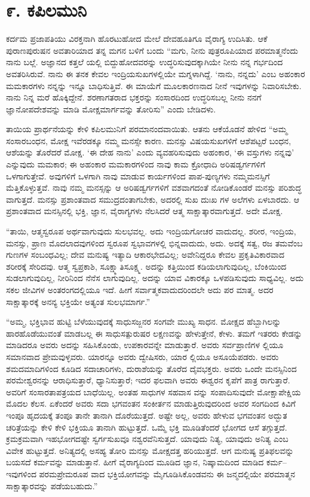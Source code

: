
\chapter{೯. ಕಪಿಲಮುನಿ}

ಕರ್ದಮ ಪ್ರಜಾಪತಿಯು ವಿರಕ್ತನಾಗಿ ಹೊರಟುಹೋದ ಮೇಲೆ ದೇವಹೂತಿಗೂ ವೈರಾಗ್ಯ ಉದಿಸಿತು. ಆಕೆ ಪುರಾಣಪುರುಷನ ಅವತಾರಿಯಾದ ತನ್ನ ಮಗನ ಬಳಿಗೆ ಬಂದು “ಮಗು, ನೀನು ಪುತ್ರರೂಪಿಯಾದ ಪರಮಾತ್ಮನೆಂದು ನಾನು ಬಲ್ಲೆ. ಅಜ್ಞಾನದ ಕತ್ತಲೆ ಯಲ್ಲಿ ಬಿದ್ದುಹೋದವರನ್ನು ಉದ್ಧರಿಸುವುದಕ್ಕಾಗಿಯೇ ನೀನು ನನ್ನ ಗರ್ಭದಿಂದ ಅವತರಿಸಿರುವೆ. ನಾನು ಈ ತನಕ ಕೇವಲ ಇಂದ್ರಿಯಸುಖಗಳಲ್ಲಿಯೇ ಮಗ್ನಳಾಗಿದ್ದೆ. ‘ನಾನು, ನನ್ನದು’ ಎಂಬ ಅಹಂಕಾರ ಮಮಕಾರಗಳು ನನ್ನನ್ನು ಇನ್ನೂ ಬಾಧಿಸುತ್ತಿವೆ. ಈ ಮಾಯೆಗೆ ಮೂಲಕಾರಣನಾದ ನೀನೆ ಇವುಗಳನ್ನು ನಿವಾರಿಸಬೇಕು. ನಾನು ನಿನ್ನ ಮರೆ ಹೊಕ್ಕಿದ್ದೇನೆ. ಶರಣಾಗತರಾದ ಭಕ್ತರನ್ನು ಸಂಸಾರದಿಂದ ಉದ್ಧರಿಸಬಲ್ಲ ನೀನು ನನಗೆ ಜ್ಞಾನೋಪದೇಶವನ್ನು ಮಾಡಿ ಮೋಕ್ಷಮಾರ್ಗವನ್ನು ತೋರಿಸು” ಎಂದು ಬೇಡಿದಳು.

ತಾಯಿಯ ಪ್ರಾರ್ಥನೆಯನ್ನು ಕೇಳಿ ಕಪಿಲಮುನಿಗೆ ಪರಮಾನಂದವಾಯಿತು. ಆತನು ಆಕೆಯೊಡನೆ ಹೇಳಿದ “ಅಮ್ಮ ಸಂಸಾರಬಂಧನ, ಮೋಕ್ಷ ಇವೆರಡಕ್ಕೂ ನಮ್ಮ ಮನಸ್ಸೇ ಕಾರಣ. ಮನಸ್ಸು ವಿಷಯಸುಖಗಳಿಗೆ ಆಶೆಪಟ್ಟರೆ ಬಂಧನ, ಆಶೆಯನ್ನು ತೊರೆದರೆ ಮೋಕ್ಷ. ‘ಈ ದೇಹ ನಾನು’ ಎಂದು ವ್ಯವಹರಿಸುವುದು ಅಹಂಕಾರ, ‘ಈ ವಸ್ತುಗಳು ನನ್ನವು’ ಎನ್ನುವುದು ಮಮಕಾರ; ಈ ಅಹಂಕಾರ ಮಮಕಾರಗಳಿಂದ ನಾವು ಕಾಮ ಕ್ರೋಧಾದಿ ಅರಿಷಡ್ವರ್ಗಗಳಿಗೆ ಒಳಗಾಗುತ್ತೇವೆ. ಅವುಗಳಿಗೆ ಒಳಗಾಗಿ ನಾವು ಮಾಡುವ ಕಾರ್ಯಗಳಿಂದ ಪಾಪ-ಪುಣ್ಯಗಳು ನಮ್ಮಮನಸ್ಸಿಗೆ ಮೆತ್ತಿಕೊಳ್ಳುತ್ತವೆ. ನಾವು ನಮ್ಮ ಮನಸ್ಸನ್ನು ಆ ಅರಿಷಡ್ವರ್ಗಗಳಿಗೆ ವಶವಾಗದಂತೆ ನೋಡಿಕೊಂಡರೆ ಮನಸ್ಸು ಪರಿಶುದ್ಧ ವಾಗುತ್ತದೆ. ಮನಸ್ಸು ಪ್ರಶಾಂತವಾದ ಸಮುದ್ರದಂತಾಗಬೇಕು, ಅದರಲ್ಲಿ ಸುಖ ದುಃಖ ಗಳ ಅಲೆಗಳು ಏಳಬಾರದು. ಆ ಪ್ರಶಾಂತವಾದ ಮನಸ್ಸಿನಲ್ಲಿ ಭಕ್ತಿ, ಜ್ಞಾನ, ವೈರಾಗ್ಯಗಳು ನೆಲಸಿದರೆ ಆತ್ಮ ಸಾಕ್ಷಾತ್ಕಾರವಾಗುತ್ತದೆ. ಅದೇ ಮೋಕ್ಷ. 

“ತಾಯಿ, ಆತ್ಮಸ್ವರೂಪ ಅರ್ಥವಾಗುವುದು ಸುಲಭವಲ್ಲ. ಅದು ಇಂದ್ರಿಯಗೋಚರ ವಾದುದಲ್ಲ. ಶರೀರ, ಇಂದ್ರಿಯ, ಮನಸ್ಸು, ಪ್ರಾಣ ಮೊದಲಾದವುಗಳಿಂದ ಸ್ವರೂಪ ಸ್ವಭಾವಗಳಲ್ಲಿ ಭಿನ್ನವಾದುದು, ಅದು. ಅದಕ್ಕೆ ಸತ್ವ, ರಜ ತಮವೆಂಬ ಗುಣಗಳ ಸಂಬಂಧವಿಲ್ಲ; ದೇವ ಮನುಷ್ಯ ಇತ್ಯಾದಿ ಆಕಾರಭೇದವಿಲ್ಲ; ಅವೇನಿದ್ದರೂ ಕೇವಲ ಪ್ರಕೃತಿವಿಕಾರವಾದ ಶರೀರಕ್ಕೆ ಸೇರಿದವು. ಆತ್ಮ ಸ್ವಪ್ರಕಾಶಿ, ಸೂಕ್ಷ್ಮಾತಿಸೂಕ್ಷ್ಮ. ಅದನ್ನು ಕತ್ತಿಯಿಂದ ಕಡಿಯಲಾಗುವುದಿಲ್ಲ, ಬೆಂಕಿಯಿಂದ ಸುಡಲಾಗುವುದಿಲ್ಲ, ನೀರಿನಿಂದ ನೆನೆಸ ಲಾಗುವುದಿಲ್ಲ. ಅದನ್ನು ಯಾವ ವಿಕಾರಕ್ಕೂ ಒಳಪಡಿಸುವುದು ಸಾಧ್ಯವಿಲ್ಲ. ಅದು ಸಕಲ ಜೀವಿಗಳ ಅಂತರಂಗದಲ್ಲಿಯೂ ಇದೆ. ಹೀಗೆ ಸರ್ವಾತ್ಮಕವಾದುದರಿಂದಲೇ ಅದು ಪರ ಮಾತ್ಮ. ಅದರ ಸಾಕ್ಷಾತ್ಕಾರಕ್ಕೆ ಅನನ್ಯ ಭಕ್ತಿಯೇ ಅತ್ಯಂತ ಸುಲಭಮಾರ್ಗ.”

“ಅಮ್ಮ, ಭಕ್ತಿಭಾವ ಹುಟ್ಟಿ ಬೆಳೆಯುವುದಕ್ಕೆ ಸಾಧುಸಜ್ಜನರ ಸಂಗವೇ ಮುಖ್ಯ ಸಾಧನ. ಮೋಕ್ಷದ ಹೆಬ್ಬಾಗಿಲನ್ನು ಹಾರಹೊಡೆಯುವಂತೆ ಮಾಡಬಲ್ಲ ಈ ಸಾಧುಸತ್ಪುರುಷರ ಲಕ್ಷಣವನ್ನು ಹೇಳುತ್ತೇನೆ, ಕೇಳು. ತಮಗೆ ಇತರರು ಕೇಡನ್ನು ಮಾಡಿದರೂ ಅವರು ಅದನ್ನು ಸಹಿಸಿಕೊಂಡು, ಉಪಕಾರವನ್ನೇ ಮಾಡುತ್ತಾರೆ. ಅವರು ಸರ್ವಪ್ರಾಣಿಗಳ ಲ್ಲಿಯೂ ಸಮಾನವಾದ ಪ್ರೇಮವುಳ್ಳವರು. ಯಾರನ್ನೂ ಅವರು ದ್ವೇಷಿಸರು, ಯಾರ ಲ್ಲಿಯೂ ಅಸೂಯೆಪಡರು. ಅವರು ಶಮದಮಾದಿಗಳಿಂದ ಕೂಡಿದ ಸದಾಚಾರಿಗಳು, ದುರಾಶೆಯನ್ನು ತೊರೆದ ದೈವಭಕ್ತರು. ಅವರು ಒಂದೇ ಮನಸ್ಸಿನಿಂದ ಪರಮೇಶ್ವರನನ್ನು ಆರಾಧಿಸುತ್ತಾರೆ, ಧ್ಯಾನಿಸುತ್ತಾರೆ; ಇದರ ಫಲವಾಗಿ ಅವರು ಈಶ್ವರನ ಕೃಪೆಗೆ ಪಾತ್ರ ರಾಗುತ್ತಾರೆ. ಅವರಿಗೆ ಸಂಸಾರತಾಪತ್ರಯದ ಬಾಧೆಯಿಲ್ಲ. ಅಂತಹ ಸಾಧುಗಳ ಸಹವಾಸ ವನ್ನು ಸಂಪಾದಿಸುವುದೇ ಮೋಕ್ಷಾಪೇಕ್ಷಿಯ ಮೊದಲ ಕೆಲಸ. ಏಕೆಂದರೆ ಅವರು ಸದಾ ಭಗವಂತನ ಸಂಕೀರ್ತನ ಮಾಡುತ್ತಿರುವುದರಿಂದ ಅವರ ಸಂಗದಿಂದ ಕಿವಿಗೆ ಇಂಪೂ ಹೃದಯಕ್ಕೆ ತಂಪೂ ತಾನೇ ತಾನಾಗಿ ದೊರೆಯುತ್ತದೆ. ಅಷ್ಟೇ ಅಲ್ಲ, ಅವರು ಹೇಳುವ ಭಗವಂತನ ಅದ್ಭುತ ಚರಿತ್ರೆಯನ್ನು ಕೇಳಿ ಕೇಳಿ ಭಕ್ತಿಯೂ ತಾನಾಗಿ ಹುಟ್ಟುತ್ತದೆ. ಒಮ್ಮೆ ಭಕ್ತಿ ಮೂಡಿತೆಂದರೆ ಭೋಗದ ಆಸೆ ತಗ್ಗುತ್ತದೆ. ಕ್ರಮಕ್ರಮವಾಗಿ ಇಹಭೋಗದಷ್ಟೇ ಸ್ವರ್ಗಸುಖವೂ ನಶ್ವರವೆನಿಸುತ್ತದೆ. ಯಾವುದು ನಿತ್ಯ, ಯಾವುದು ಅನಿತ್ಯ ಎಂಬ ವಿವೇಕ ಹುಟ್ಟುತ್ತದೆ. ಅನಿತ್ಯದಲ್ಲಿ ಅಸಹ್ಯ ತೋರಿ ಮನಸ್ಸು ಮೋಕ್ಷದತ್ತ ಹರಿಯುತ್ತದೆ. ಆಗ ಮನುಷ್ಯ ಪ್ರತಿಫಲವನ್ನು ಬಯಸದೆ ಕರ್ಮವನ್ನು ಮಾಡುತ್ತಾನೆ. ಹೀಗೆ ವೈರಾಗ್ಯದಿಂದ ಮೂಡಿದ ಜ್ಞಾನ, ನಿಷ್ಕಾಮದಿಂದ ಮಾಡಿದ ಕರ್ಮ–ಇವುಗಳಿಂದ ಪರಮಪ್ರೇಮರೂಪ ವಾದ ಭಕ್ತಿಯೋಗವನ್ನು ಮೈಗೂಡಿಸಿಕೊಂಡವನು ಈ ಜನ್ಮದಲ್ಲಿಯೇ ಪರಮಾತ್ಮನ ಸಾಕ್ಷಾತ್ಕಾರವನ್ನು ಪಡೆಯಬಹುದು.”

